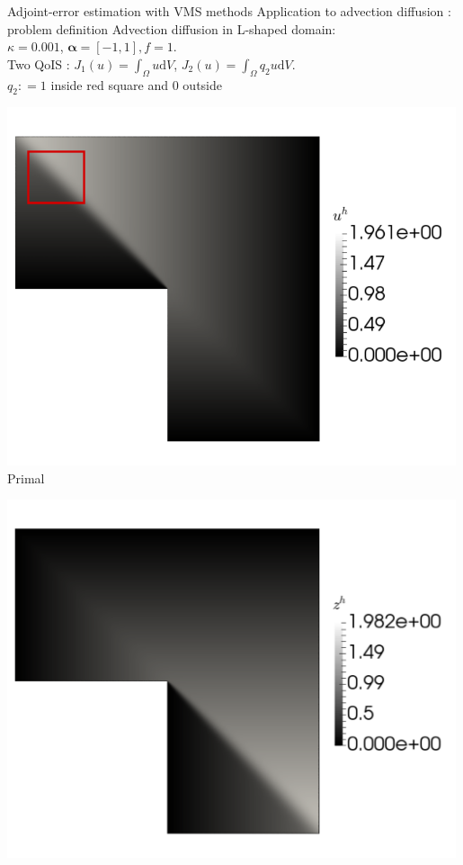 \documentclass[fleqn]{beamer}
\newcommand{\bs}[1]{\boldsymbol{#1}}
\begin{document}
\begin{frame}{Adjoint-error estimation with VMS methods}
{Application to advection diffusion : problem definition}
\vspace*{-1em}
Advection diffusion in L-shaped domain: \\
$\kappa = 0.001$, $\bs{\alpha} = [-1,1], f= 1$. \\ [8pt]
Two QoIS : $J_1(u) = \int_{\Omega} u \text{d} V$,   $J_2(u) = \int_{\Omega} q_2 u \text{d} V$. \\ [8pt]
$q_2 : = 1$ inside red square and $0$ outside \\ [8pt]
\begin{minipage}{0.33\textwidth}
\centering
\includegraphics[width=0.99\textwidth]{../img/defend_lshape_uh} \\
Primal
\end{minipage}%
\begin{minipage}{0.33\textwidth}
\centering
\includegraphics[width=0.99\textwidth]{../img/vms_lshape_global_zh} \\

\end{minipage}
\end{frame}
\end{document}
